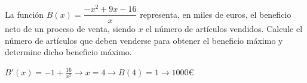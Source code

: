 \documentclass[addpoints,spanish, 12pt,a4paper]{exam}
\begin{document}
\begin{questions}

\question[2] La función $B(x) = \dfrac{-x^2 + 9x - 16}{x}$ representa, en miles de euros, el beneficio neto de un proceso de venta, siendo \( x \) el número de artículos vendidos. Calcule el número de artículos que deben venderse para obtener el beneficio máximo y determine dicho beneficio máximo.
\begin{solution}
    $B'(x)=-1 + \frac{16}{x^{2}} \to x=4 \to B(4)=1 \to 1000 \euro$
\end{solution}

    


\end{questions}
\end{document}
